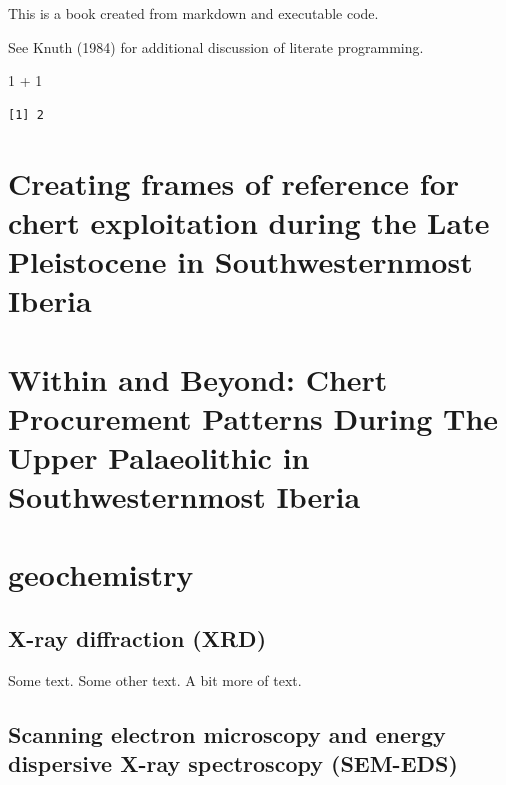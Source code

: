 \documentclass[
  a4paper,
  DIV=11,
  numbers=noendperiod]{scrreprt}
\newenvironment{Shaded}{\begin{snugshade}}{\end{snugshade}}
\newcommand{\DecValTok}[1]{\textcolor[rgb]{0.68,0.00,0.00}{#1}}
\newcommand{\SpecialCharTok}[1]{\textcolor[rgb]{0.37,0.37,0.37}{#1}}
\begin{document}
This is a book created from markdown and executable code.

See Knuth (1984) for additional discussion of literate programming.

\begin{Shaded}
\begin{Highlighting}[]
\DecValTok{1} \SpecialCharTok{+} \DecValTok{1}
\end{Highlighting}
\end{Shaded}

\begin{verbatim}
[1] 2
\end{verbatim}


\chapter{Creating frames of reference for chert exploitation during the
Late Pleistocene in Southwesternmost
Iberia}\label{creating-frames-of-reference-for-chert-exploitation-during-the-late-pleistocene-in-southwesternmost-iberia}


\chapter{Within and Beyond: Chert Procurement Patterns During The Upper
Palaeolithic in Southwesternmost
Iberia}\label{within-and-beyond-chert-procurement-patterns-during-the-upper-palaeolithic-in-southwesternmost-iberia}


\chapter{geochemistry}\label{geochemistry}

\section{X-ray diffraction (XRD)}\label{x-ray-diffraction-xrd}

Some text. Some other text. A bit more of text.

\section{Scanning electron microscopy and energy dispersive X-ray
spectroscopy
(SEM-EDS)}\label{scanning-electron-microscopy-and-energy-dispersive-x-ray-spectroscopy-sem-eds}
\end{document}
